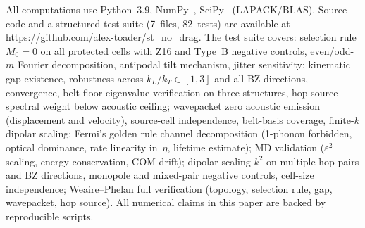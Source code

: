 \documentclass[12pt]{article}
\begin{document}
All computations use Python~3.9, NumPy~\cite{numpy},
SciPy~\cite{scipy} (LAPACK/BLAS).  Source code and a structured test
suite (7~files, 82~tests) are available at
\url{https://github.com/alex-toader/st_no_drag}.  The test suite
covers: selection rule $M_0 = 0$ on all protected cells with Z16 and
Type~B negative controls, even/odd-$m$ Fourier decomposition,
antipodal tilt mechanism, jitter sensitivity; kinematic gap existence,
robustness across $k_L/k_T \in [1,3]$ and all BZ directions,
convergence, belt-floor eigenvalue verification on three structures,
hop-source spectral weight below acoustic ceiling; wavepacket zero
acoustic emission (displacement and velocity), source-cell
independence, belt-basis coverage, finite-$k$ dipolar scaling;
Fermi's golden rule channel decomposition (1-phonon forbidden,
optical dominance, rate linearity in~$\eta$, lifetime estimate); MD
validation ($\varepsilon^2$ scaling, energy conservation, COM drift);
dipolar scaling $k^2$ on multiple hop pairs and BZ directions,
monopole and mixed-pair negative controls, cell-size independence;
Weaire--Phelan full verification (topology, selection rule, gap,
wavepacket, hop source).  All numerical claims in this paper are
backed by reproducible scripts.
\end{document}

